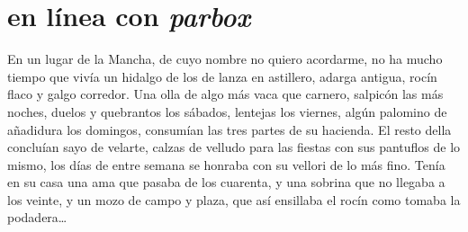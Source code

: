 \documentclass[letterpaper,12pt]{article}
\begin{document}
\section{ en línea con \textit{parbox}}
\hfill \parbox{11cm}{En un lugar de la Mancha, de cuyo nombre no quiero acordarme, 
no ha mucho tiempo que vivía un hidalgo de los de lanza en astillero, adarga antigua, 
rocín flaco y galgo corredor. Una olla de algo más vaca que carnero, salpicón las más 
noches, duelos y quebrantos los sábados, lentejas los viernes, algún palomino de añadidura 
los domingos, consumían las tres partes de su hacienda. El resto della concluían sayo 
de velarte, calzas de velludo para las fiestas con sus pantuflos de lo mismo, los días 
de entre semana se honraba con su vellori de lo más fino. Tenía en su casa una ama que 
pasaba de los cuarenta, y una sobrina que no llegaba a los veinte, y un mozo de campo 
y plaza, que así ensillaba el rocín como tomaba la podadera\dots }
\end{document}
